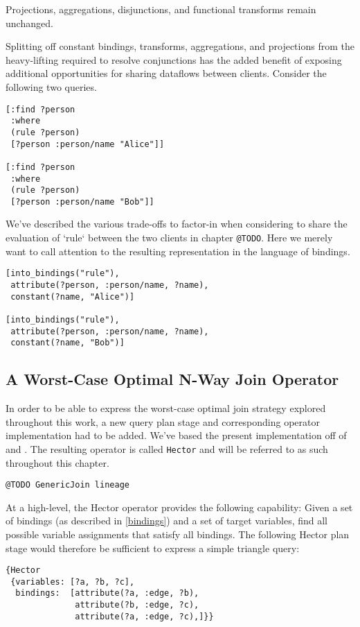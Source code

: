 \documentclass[../index.tex]{subfiles}
\begin{document}
Projections, aggregations, disjunctions, and functional transforms
remain unchanged.

Splitting off constant bindings, transforms, aggregations, and
projections from the heavy-lifting required to resolve conjunctions
has the added benefit of exposing additional opportunities for sharing
dataflows between clients. Consider the following two queries.

\begin{verbatim}
[:find ?person
 :where
 (rule ?person)
 [?person :person/name "Alice"]]

[:find ?person
 :where
 (rule ?person)
 [?person :person/name "Bob"]]
\end{verbatim}

We've described the various trade-offs to factor-in when considering
to share the evaluation of `rule` between the two clients in chapter
\texttt{@TODO}. Here we merely want to call attention to the resulting
representation in the language of bindings.

\begin{verbatim}
[into_bindings("rule"),
 attribute(?person, :person/name, ?name),
 constant(?name, "Alice")]

[into_bindings("rule"),
 attribute(?person, :person/name, ?name),
 constant(?name, "Bob")]
\end{verbatim}

\subsection{A Worst-Case Optimal N-Way Join Operator} \label{impl-hector}

In order to be able to express the worst-case optimal join strategy
explored throughout this work, a new query plan stage and
corresponding operator implementation had to be added. We've based the
present implementation off of \cite{dogsdogsdogs} and
\cite{dataflowjoin}. The resulting operator is called \texttt{Hector}
and will be referred to as such throughout this chapter.

\texttt{@TODO GenericJoin lineage}

At a high-level, the Hector operator provides the following
capability: Given a set of bindings (as described in \ref{bindings})
and a set of target variables, find all possible variable assignments
that satisfy all bindings. The following Hector plan stage would
therefore be sufficient to express a simple triangle query:

\begin{verbatim}
{Hector
 {variables: [?a, ?b, ?c],
  bindings:  [attribute(?a, :edge, ?b),
              attribute(?b, :edge, ?c),
              attribute(?a, :edge, ?c),]}}
\end{verbatim}
\end{document}
